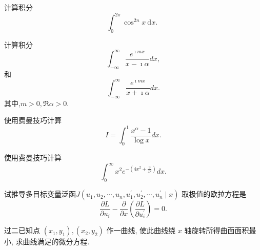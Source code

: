 \documentclass[10pt]{article}
\newenvironment{problem}[2][]{\begin{trivlist}
\item[\hskip \labelsep {\bfseries #1}\hskip \labelsep {\bfseries #2}]}{\end{trivlist}}
\begin{document}
\renewcommand{\labelenumi}{(\arabic{enumi})}
\renewcommand{\labelenumii}{(\arabic{enumi}.\arabic{enumii})}



 




\begin{problem}{5.1}
计算积分
$$
\int_0^{2 \pi} \cos ^{2 n} x \mathrm{~d} x \text {. }
$$
\end{problem}

\begin{problem}{5.2}
  计算积分
  $$
  \int_{-\infty}^{\infty} \frac{e^{\imath m x}}{x-\imath \alpha} d x,
  $$
  和
  $$
  \int_{-\infty}^{\infty} \frac{e^{\imath m x}}{x+\imath \alpha} d x.
  $$
  其中,$m>0, \Re \alpha > 0$.
  \end{problem}
  
\begin{problem}{5.3}
    使用费曼技巧计算
    $$
    I = \int_0^1 \frac{x^\alpha-1}{\log x} d x . 
    $$
  \end{problem}
   
\begin{problem}{5.4}
     使用费曼技巧计算
     $$
     \int_0^{\infty} x^2 e^{-\left(4 x^2+\frac{9}{x^2}\right)} d x .
     $$
\end{problem}

\begin{problem}{5.5}
试推导多目标变量泛函$J\left(u_1, u_2, \cdots, u_n, u_1^{\prime}, u_2^{\prime}, \cdots, u_n^{\prime} \mid x\right)$
取极值的欧拉方程是
$$
\frac{\partial L}{\partial u_i}-\frac{\partial}{\partial x}\left(\frac{\partial L}{\partial u_i^{\prime}}\right)=0 .
$$
\end{problem}


\begin{problem}{5.5}
  过二已知点 $\left(x_1, y_1\right),\left(x_2, y_2\right)$ 作一曲线, 使此曲线绕 $x$ 轴旋转所得曲面面积最小, 求曲线满足的微分方程.
\end{problem}
\end{document}
